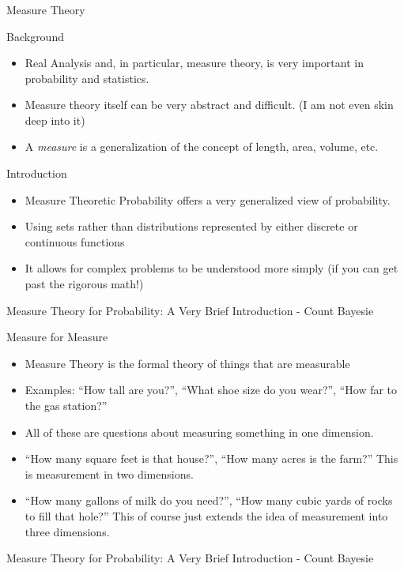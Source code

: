   \begin{frame}[fragile]\frametitle{}
\begin{center}
{\Large Measure Theory }
\end{center}
\end{frame}


  \begin{frame}[fragile]{Background}
\begin{itemize} 
\item Real Analysis and, in particular, measure theory, is very important in probability and statistics. 
\item Measure theory itself can be very abstract and difficult. (I am not even skin deep into it)
\item A \emph{measure} is a generalization of the concept of length, area, volume, etc. 
\end{itemize}

\end{frame}


  \begin{frame}[fragile]{Introduction}
\begin{itemize} 
\item  Measure Theoretic Probability offers a very generalized view of probability. \item Using sets rather than distributions represented by either discrete or continuous functions
\item It allows for complex problems to be understood more simply (if you can get past the rigorous math!)

\end{itemize}

\tiny{Measure Theory for Probability: A Very Brief Introduction - Count Bayesie}
\end{frame}

  \begin{frame}[fragile]{Measure for Measure}
\begin{itemize} 
\item  Measure Theory is the formal theory of things that are measurable
\item Examples: ``How tall are you?'', ``What shoe size do you wear?'', ``How far to the gas station?'' 
\item All of these are questions about measuring something in one dimension.
\item ``How many square feet is that house?'', ``How many acres is the farm?'' This is measurement in two dimensions.
\item ``How many gallons of milk do you need?'', ``How many cubic yards of rocks to fill that hole?''  This of course just extends the idea of measurement into three dimensions.
\end{itemize}

\tiny{Measure Theory for Probability: A Very Brief Introduction - Count Bayesie}
\end{frame}


